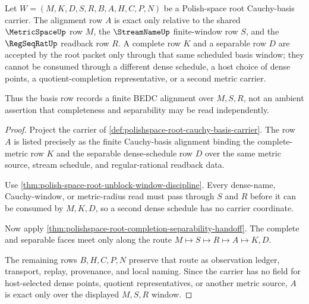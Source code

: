 \begin{theorem}
\label{thm:polishspace-root-basis-window-exactness}
Let $W=(M,K,D,S,R,B,A,H,C,P,N)$ be a Polish-space root Cauchy-basis carrier. The alignment row $A$ is exact only relative to the shared $\MetricSpaceUp$ row $M$, the $\StreamNameUp$ finite-window row $S$, and the $\RegSeqRatUp$ readback row $R$. A complete row $K$ and a separable row $D$ are accepted by the root packet only through that same scheduled basis window; they cannot be consumed through a different dense schedule, a host choice of dense points, a quotient-completion representative, or a second metric carrier.

Thus the basis row records a finite BEDC alignment over $M,S,R$, not an ambient assertion that completeness and separability may be read independently.
\end{theorem}
\begin{proof}
Project the carrier of \autoref{def:polishspace-root-cauchy-basis-carrier}. The row $A$ is listed precisely as the finite Cauchy-basis alignment binding the complete-metric row $K$ and the separable dense-schedule row $D$ over the same metric source, stream schedule, and regular-rational readback data.

Use \autoref{thm:polish-space-root-unblock-window-discipline}. Every dense-name, Cauchy-window, or metric-radius read must pass through $S$ and $R$ before it can be consumed by $M,K,D$, so a second dense schedule has no carrier coordinate.

Now apply \autoref{thm:polishspace-root-completion-separability-handoff}. The complete and separable faces meet only along the route $M \longmapsto S \longmapsto R \longmapsto A \longmapsto K,D$.

The remaining rows $B,H,C,P,N$ preserve that route as observation ledger, transport, replay, provenance, and local naming. Since the carrier has no field for host-selected dense points, quotient representatives, or another metric source, $A$ is exact only over the displayed $M,S,R$ window.
\end{proof}

